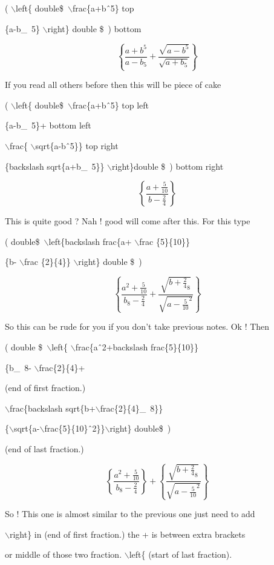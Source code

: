 \documentclass[11pt]{article}
\begin{document}
( $\backslash$left\{ double\$\ $\backslash$frac\{a+b\^\ 5\} top

\{a-b\_\ 5\}  $\backslash$right\} double \$\ ) bottom

$$ \left\{ \frac{a+b^5}{a-b_5} + \frac{\sqrt{a-b^5}}{\sqrt{a+b_5}}  \right\}$$

If you read all others before then this will be piece of cake


( $\backslash$left\{ double\$\ $\backslash$frac\{a+b\^\ 5\} top left

\{a-b\_\ 5\}+ bottom left 

$\backslash$frac\{ $\backslash$sqrt\{a-b\^\ 5\}\} top right

\{backslash sqrt\{a+b\_\ 5\}\} $\backslash$right\}double \$\ ) bottom right

$$\left\{\frac{a+\frac{5}{10}}{b-\frac{2}{4}}\right\}$$

This is quite good ? Nah ! good will come after this. For this type 

( double\$\ $\backslash$left\{backslash frac\{a+ $\backslash$frac \{5\}\{10\}\}

\{b- $\backslash$frac \{2\}\{4\}\} $\backslash$right\} double \$\ )

$$\left\{\frac{a^2+\frac{5}{10}}{b_8-\frac{2}{4}}+  \frac{\sqrt{b+\frac{2}{4}_8}}
{\sqrt{a-\frac{5}{10}^2}}  \right\}$$

So this can be rude for you if you don't take previous notes. Ok ! Then

( double \$\ $\backslash$left\{ $\backslash$frac\{a\^\ 2+backslash frac\{5\}\{10\}\}

\{b\_\ 8- $\backslash$frac\{2\}\{4\}+ 

(end of first fraction.)

$\backslash$frac\{backslash sqrt\{b+$\backslash$frac\{2\}\{4\}\_\ 8\}\}

\{$\backslash$sqrt\{a-$\backslash$frac\{5\}\{10\}\^\ 2\}\}$\backslash$right\} double\$\ )

(end of last fraction.)

$$\left\{\frac{a^2+\frac{5}{10}}{b_8-\frac{2}{4}}  \right\} + \left\{  \frac{\sqrt{b+\frac{2}{4}_8}}{\sqrt{a-\frac{5}{10}^2}}  \right\}$$

So ! This one is almost similar to the previous one just need to add

   $\backslash$right\} in (end of first fraction.) the + is between extra brackets
   
or middle of those two fraction. $\backslash$left\{ (start of last fraction).
\end{document}
